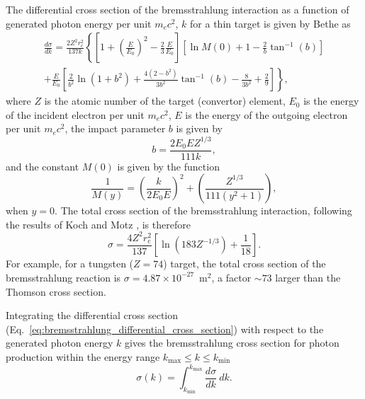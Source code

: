\documentclass[../main.tex]{subfiles}
\begin{document}
The differential cross section of the bremsstrahlung interaction as a function of generated photon energy per unit $m_{e}c^{2}$, $k$ for a thin target is given by Bethe \cite{bethe1934influence,koch1959bremsstrahlung} as 
\begin{multline}
\frac{d\sigma}{dk} = \frac{2Z^{2}r_{e}^{2}}{137k}\left\{\left[1+\left(\frac{E}{E_{0}}\right)^{2}-\frac{2}{3}\frac{E}{E_{0}}\right]\left[\ln{M\left(0\right)}+1-\frac{2}{b}\tan^{-1}\left(b\right) \right] \right.\\\left. +\frac{E}{E_{0}}\left[\frac{2}{b^{2}}\ln\left(1+b^{2}\right)+\frac{4\left(2-b^{2}\right)}{3b^{2}}\tan^{-1}\left(b\right)-\frac{8}{3b^{2}}+\frac{2}{9}\right]\right\},
\label{eq:bremsstrahlung_differential_cross_section}
\end{multline}
where $Z$ is the atomic number of the target (convertor) element, $E_{0}$ is the energy of the incident electron per unit $m_{e}c^{2}$, $E$ is the energy of the outgoing electron per unit $m_{e}c^{2}$, the impact parameter $b$ is given by 
\begin{equation}
b = \frac{2E_{0}EZ^{1/3}}{111k},
\label{eq:b_impact_parameter}    
\end{equation}
and the constant $M\left(0\right)$ \cite{schiff1951energy} is given by the function
\begin{equation}
\frac{1}{M\left(y\right)} = \left(\frac{k}{2E_{0}E}\right)^{2}+\left(\frac{Z^{1/3}}{111\left(y^{2}+1\right)}\right),
\label{eq:M0_Schiff}    
\end{equation}
when $y=0$. The total cross section of the bremsstrahlung interaction, following the results of Koch and Motz \cite{koch1959bremsstrahlung}, is therefore
\begin{equation}
\sigma = \frac{4Z^{2}r_{e}^{2}}{137}\left[\ln\left(183Z^{-1/3}\right)+\frac{1}{18}\right].
\label{eq:brem_total_cross_section}    
\end{equation}
For example, for a tungsten ($Z = 74$) target, the total cross section of the bremsstrahlung reaction is $\sigma = 4.87\times 10^{-27}$~\si{\meter}$^{2}$, a factor $\sim 73$ larger than the Thomson cross section. 

Integrating the differential cross section (Eq.~\ref{eq:bremsstrahlung_differential_cross_section}) with respect to the generated photon energy $k$ gives the bremsstrahlung cross section for photon production within the energy range $k_{\mathrm{max}} \leq k \leq k_{\mathrm{min}}$ 
\begin{equation}
\sigma\left(k\right) = \int_{k_{\mathrm{min}}}^{k_\mathrm{max}} \frac{d\sigma}{dk}~dk.
\label{eq:brem_integrated_cross_section}    
\end{equation}
\end{document}
